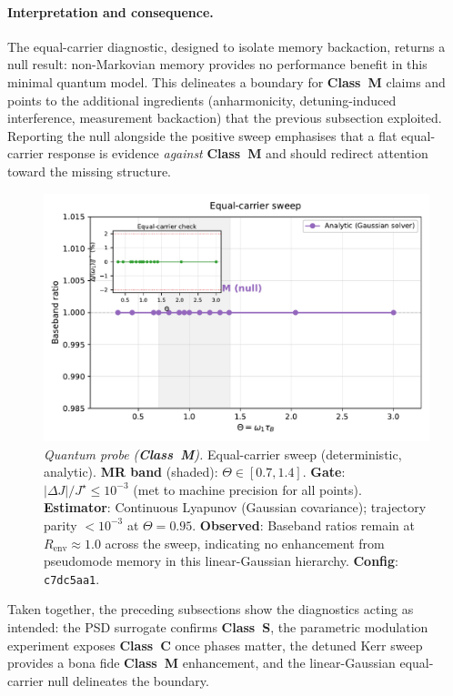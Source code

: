 \documentclass[11pt,letterpaper]{article}
\newcommand{\confighash}{c7dc5aa1}
\DeclareRobustCommand{\classS}{\textbf{Class~S}\xspace}
\DeclareRobustCommand{\classC}{\textbf{Class~C}\xspace}
\DeclareRobustCommand{\classM}{\textbf{Class~M}\xspace}
\begin{document}
\paragraph*{Interpretation and consequence.} The equal-carrier diagnostic, designed to isolate memory backaction, returns a null result: non-Markovian memory provides no performance benefit in this minimal quantum model. This delineates a boundary for \classM{} claims and points to the additional ingredients (anharmonicity, detuning-induced interference, measurement backaction) that the previous subsection exploited. Reporting the null alongside the positive sweep emphasises that a flat equal-carrier response is evidence \emph{against} \classM{} and should redirect attention toward the missing structure.

\begin{figure}[t]
\centering
\includegraphics[width=0.8\linewidth]{figB_equal_carrier.pdf}
\caption{\label{fig:quantum_null}\emph{Quantum probe (\classM).} Equal-carrier sweep (deterministic, analytic). \textbf{MR band} (shaded): $\Theta\in[0.7,1.4]$. \textbf{Gate}: $|\Delta J|/J^\star\le 10^{-3}$ (met to machine precision for all points). \textbf{Estimator}: Continuous Lyapunov (Gaussian covariance); trajectory parity $<10^{-3}$ at $\Theta=0.95$. \textbf{Observed}: Baseband ratios remain at $R_{\mathrm{env}}\approx 1.0$ across the sweep, indicating no enhancement from pseudomode memory in this linear-Gaussian hierarchy. \textbf{Config}: \texttt{\confighash}.}
\end{figure}

Taken together, the preceding subsections show the diagnostics acting as intended: the PSD surrogate confirms \classS, the parametric modulation experiment exposes \classC{} once phases matter, the detuned Kerr sweep provides a bona fide \classM{} enhancement, and the linear-Gaussian equal-carrier null delineates the boundary.
\end{document}
